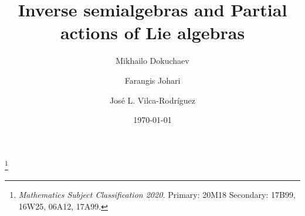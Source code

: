 \documentclass{amsart}
\newcommand{\0}{{\vartheta}}
\theoremstyle{definition}
\theoremstyle{remark}
\numberwithin{equation}{section}
\newtheorem*{Theorem A}{\textbf{Theorem A}}
\newtheorem*{Corollary E}{\textbf{Corollary E}}
\newtheorem*{Corollary F}{\textbf{Corollary F}}
\newtheorem*{Theorem B}{\textbf{Theorem B}}
\newtheorem*{Theorem C}{\textbf{Theorem C}}
\newtheorem*{Theorem D}{\textbf{Theorem B}}
\newtheorem*{p a}{\textbf{Proof of  Theorem A}}
\newtheorem*{p b}{\textbf{Proof of Theorem B}}
\newtheorem*{p c}{\textbf{Proof of  Theorem C}}
\newtheorem*{p d}{\textbf{Proof of  Theorem D}}
\begin{document}

%
\title[Inverse semialgebras and Partial actions  of Lie algebras]{Inverse semialgebras and Partial actions  of Lie algebras}
\author{Mikhailo Dokuchaev}
\address{Departamento de Matem\'atica, Universidade de S\~ao Paulo,
Rua do Mat\~ao, 1010, 05508-090 S\~ao Paulo, Brazil.}

\author{Farangis Johari}
\address{Universidade Federal do ABC, Center for Mathematics, Computing and Cognition, Av. dos Estados, 5001-Bangú, Santo André-SP, 09280-560, Brazil.}

\author{ Jos\'e L. Vilca-Rodríguez}
\address{Departamento de Matem\'atica, Universidade de S\~ao Paulo,
Rua do Mat\~ao, 1010, 05508-090 S\~ao Paulo, Brazil.}




\thanks{\textit{Mathematics Subject Classification 2020.} Primary: 20M18 Secondary: 17B99, 16W25, 06A12, 17A99.}



\date{\today}
\end{document}
